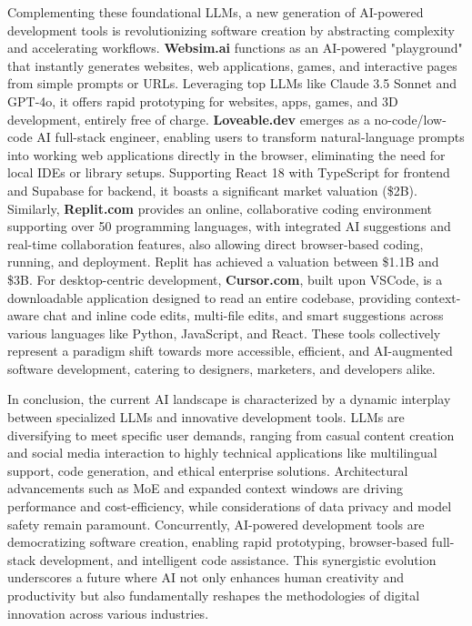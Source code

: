 \documentclass[a4paper, 12pt]{article}
\begin{document}
Complementing these foundational LLMs, a new generation of AI-powered development tools is revolutionizing software creation by abstracting complexity and accelerating workflows. \textbf{Websim.ai} functions as an AI-powered "playground" that instantly generates websites, web applications, games, and interactive pages from simple prompts or URLs. Leveraging top LLMs like Claude 3.5 Sonnet and GPT-4o, it offers rapid prototyping for websites, apps, games, and 3D development, entirely free of charge. \textbf{Loveable.dev} emerges as a no-code/low-code AI full-stack engineer, enabling users to transform natural-language prompts into working web applications directly in the browser, eliminating the need for local IDEs or library setups. Supporting React 18 with TypeScript for frontend and Supabase for backend, it boasts a significant market valuation (\$2B). Similarly, \textbf{Replit.com} provides an online, collaborative coding environment supporting over 50 programming languages, with integrated AI suggestions and real-time collaboration features, also allowing direct browser-based coding, running, and deployment. Replit has achieved a valuation between \$1.1B and \$3B. For desktop-centric development, \textbf{Cursor.com}, built upon VSCode, is a downloadable application designed to read an entire codebase, providing context-aware chat and inline code edits, multi-file edits, and smart suggestions across various languages like Python, JavaScript, and React. These tools collectively represent a paradigm shift towards more accessible, efficient, and AI-augmented software development, catering to designers, marketers, and developers alike.

In conclusion, the current AI landscape is characterized by a dynamic interplay between specialized LLMs and innovative development tools. LLMs are diversifying to meet specific user demands, ranging from casual content creation and social media interaction to highly technical applications like multilingual support, code generation, and ethical enterprise solutions. Architectural advancements such as MoE and expanded context windows are driving performance and cost-efficiency, while considerations of data privacy and model safety remain paramount. Concurrently, AI-powered development tools are democratizing software creation, enabling rapid prototyping, browser-based full-stack development, and intelligent code assistance. This synergistic evolution underscores a future where AI not only enhances human creativity and productivity but also fundamentally reshapes the methodologies of digital innovation across various industries.
\end{document}
